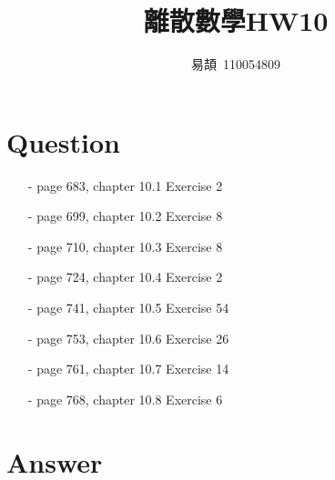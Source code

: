 \documentclass[sigconf]{acmart}
\begin{document}
\title{離散數學HW10}

\author{易頡~110054809}
\orcid{}

\renewcommand\footnotetextcopyrightpermission[1]{} %
\pagestyle{plain} %

\maketitle

\section{Question}
\begin{itemize}
	\item[-] page 683, chapter 10.1 Exercise 2
	\item[-] page 699, chapter 10.2 Exercise 8
	\item[-] page 710, chapter 10.3 Exercise 8
	\item[-] page 724, chapter 10.4 Exercise 2
	\item[-] page 741, chapter 10.5 Exercise 54
	\item[-] page 753, chapter 10.6 Exercise 26
	\item[-] page 761, chapter 10.7 Exercise 14
	\item[-] page 768, chapter 10.8 Exercise 6
\end{itemize}

\section{Answer}
\end{document}
